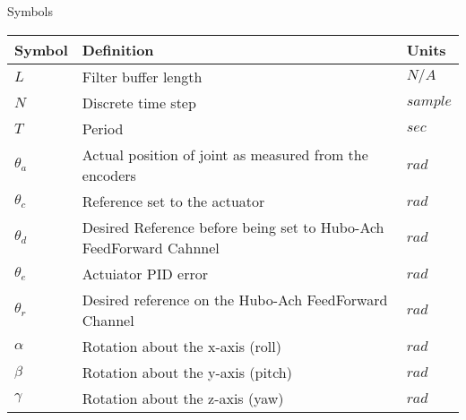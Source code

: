 \Large
\centering
Symbols\\
\normalsize
\begin{tabular}{l | l | l}
\hline
Symbol     & Definition                                                         & Units \\
\hline
$L$        & Filter buffer length                                               & $N/A$\\
\hline
$N$        & Discrete time step                                                 & $sample$\\
\hline
$T$        & Period                                                             & $sec$ \\
\hline
$\theta_a$ & Actual position of joint as measured from the encoders             & $rad$ \\
\hline
$\theta_c$ & Reference set to the actuator                                      & $rad$ \\
\hline
$\theta_d$ & Desired Reference before being set to Hubo-Ach FeedForward Cahnnel & $rad$ \\
\hline
$\theta_e$ & Actuiator PID error                                                & $rad$ \\
\hline
$\theta_r$ & Desired reference on the Hubo-Ach FeedForward Channel              & $rad$ \\
\hline
$\alpha$   & Rotation about the x-axis (roll)					& $rad$ \\
\hline
$\beta$    & Rotation about the y-axis (pitch)                                  & $rad$ \\
\hline
$\gamma$   & Rotation about the z-axis (yaw)                                    & $rad$ \\
\hline

\end{tabular}
